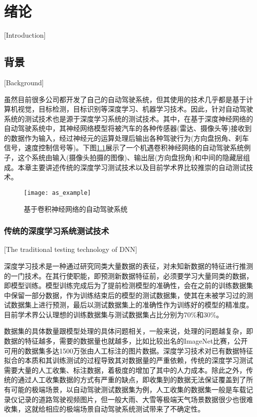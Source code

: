 
\chapter{绪论}[Introduction]

\section{背景}[Background]

虽然目前很多公司都开发了自己的自动驾驶系统，但其使用的技术几乎都是基于计算机视觉，目标检测，目标识别等深度学习、机器学习技术。因此，针对自动驾驶系统的测试技术也是源于深度学习系统的测试技术。其中，在基于深度神经网络的自动驾驶系统中，其神经网络模型将被汽车的各种传感器(雷达、摄像头等)接收到的数据作为输入，经过神经元的运算处理后输出各种驾驶行为(方向盘拐角、刹车信号，速度控制信号等)。下图\ref{as_example}展示了一个机遇卷积神经网络的自动驾驶系统例子，这个系统由输入(摄像头拍摄的图像)、输出层(方向盘拐角)和中间的隐藏层组成。本章主要讲述传统的深度学习测试技术以及目前学术界比较推崇的自动测试技术。

\begin{figure}[h]
    \centering
    \texttt{[image: as\_example]}
    \caption{基于卷积神经网络的自动驾驶系统\cite{DeepRoad}}
    \label{as_example}
\end{figure}

\subsection{传统的深度学习系统测试技术}[The traditional testing technology of DNN]

深度学习技术是一种通过研究同类大量数据的表征，对未知新数据的特征进行推测的一门技术。在其行使职能，即预测新数据特征前，必须要学习大量同类的数据，即模型训练。模型训练完成后为了提前检测模型的准确性，会在之前的训练数据集中保留一部分数据，作为训练结束后的模型的测试数据集，使其在未被学习过的测试数据集上进行预测，最后以测试数据集上的准确性作为训练好的模型的精准度。目前学术界公认理想的训练数据集与测试数据集占比分别为70\%和30\%。


数据集的具体数量跟模型处理的具体问题相关，一般来说，处理的问题越复杂，即数据的特征越多，需要的数据量也就越多，比如比较出名的ImageNet\cite{ImageNet}比赛，公开可用的数据集多达1500万张由人工标注的图片数据。深度学习技术对已有数据特征拟合的本质和其训练测试的过程导致其对数据量的严重依赖，传统的深度学习测试需要大量的人工收集、标注数据，着极度的增加了其中的人力成本。除此之外，传统的通过人工收集数据的方式有严重的缺点，即收集到的数据无法保证覆盖到了所有可能的极端场景，以自动驾驶测试数据集为例，人工收集的数据集一般是车载记录仪记录的道路驾驶视频图片，但一般大雨、大雪等极端天气场景数据很少也很难收集，这就给相应的极端场景自动驾驶系统测试带来了不确定性。

